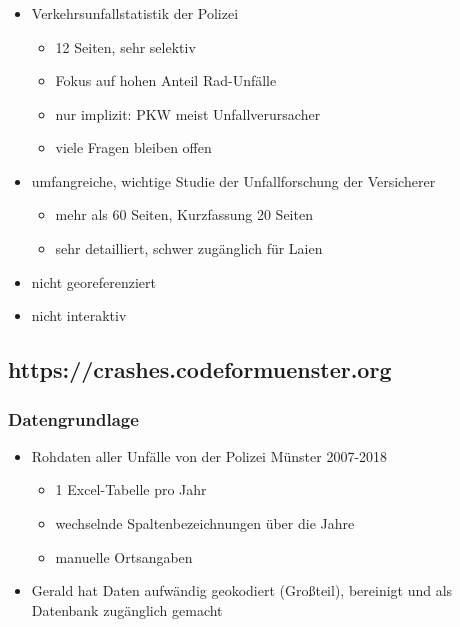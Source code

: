 \documentclass{beamer}
\begin{document}
\begin{frame}
  \frametitle{\subsecname}
  
  \begin{itemize}
    \item Verkehrsunfallstatistik der Polizei \cite{Polizei2019}
    \begin{itemize}
      \item 12 Seiten, sehr selektiv
      \item Fokus auf hohen Anteil Rad-Unfälle
      \item nur implizit: PKW meist Unfallverursacher
      \item viele Fragen bleiben offen
    \end{itemize}
    \pause
    \item umfangreiche, wichtige Studie der Unfallforschung der Versicherer \cite{Baier2018}
    \begin{itemize}
      \item mehr als 60 Seiten, Kurzfassung 20 Seiten
      \item sehr detailliert, schwer zugänglich für Laien
    \end{itemize}
      \pause
      \item nicht georeferenziert
      \item nicht interaktiv
  \end{itemize}
\end{frame}

\subsection{https://crashes.codeformuenster.org}

\begin{frame}
  \frametitle{Datengrundlage}
  
  \begin{itemize}
    \item Rohdaten aller Unfälle von der Polizei Münster 2007-2018
    \begin{itemize}
      \item 1 Excel-Tabelle pro Jahr
      \item wechselnde Spaltenbezeichnungen über die Jahre
      \item manuelle Ortsangaben
    \end{itemize}
    \pause
    \item Gerald hat Daten aufwändig geokodiert (Großteil), bereinigt und als Datenbank zugänglich gemacht
  \end{itemize}
  
\end{frame}
\end{document}
